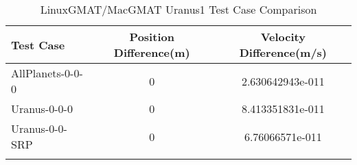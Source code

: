 \begin{table}[htbp!]
\centering
\caption{ LinuxGMAT/MacGMAT Uranus1 Test Case Comparison}
      \begin{tabular}{lcc}
      \hline\hline
          Test Case & Position Difference(m) & Velocity Difference(m/s) \\
         \hline
         AllPlanets-0-0-0 & 0 & 2.630642943e-011 \\
         Uranus-0-0-0 & 0 & 8.413351831e-011 \\
         Uranus-0-0-SRP & 0 & 6.76066571e-011 \\
      \hline\hline
      \label{Table: Uranus1 LinuxGMAT-MacGMAT Table} 
\end{tabular}
\end{table}
